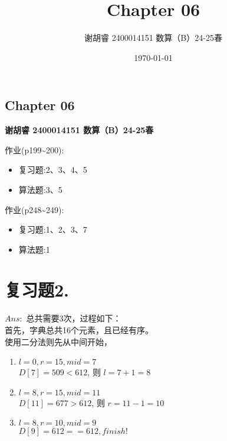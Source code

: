 \documentclass{ctexart}
\title{Chapter 06}
\author{谢胡睿 2400014151 数算（B）24-25春}
\date{\today}
\begin{document}
\maketitle
\begin{center}
\section*{Chapter 06}
\textbf{谢胡睿 2400014151 数算（B）24-25春}
\end{center}

作业(p199\textasciitilde200):
\begin{itemize}
    \item 复习题:2、3、4、5
    \item 算法题:3、5
\end{itemize}

作业(p248\textasciitilde249):
\begin{itemize}
    \item 复习题:1、2、3、7
    \item 算法题:1
\end{itemize}

\section*{复习题2.}
$Ans:$ 总共需要3次，过程如下：\\
首先，字典总共16个元素，且已经有序。\\
使用二分法则先从中间开始，
\begin{enumerate}
    \item $l=0, r=15, mid=7$ \\
    $D[7]=509 < 612$, 则 $l=7+1=8$
    \item $l=8, r=15, mid=11$ \\
    $D[11]=677 > 612$, 则 $r=11-1=10$
    \item $l=8, r=10, mid=9$ \\
    $D[9]=612 == 612, finish!$
\end{enumerate}
\end{document}
